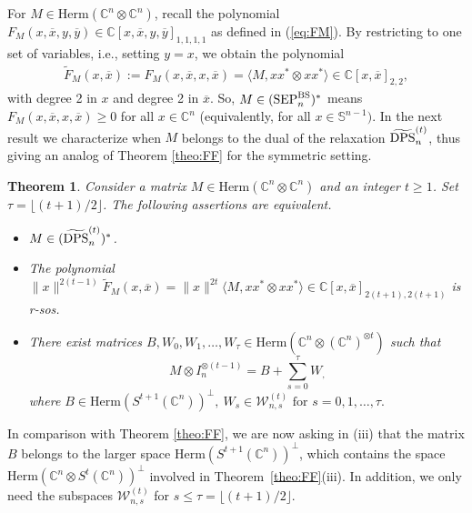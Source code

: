 \documentclass[11pt]{article}
\newcommand{\C}{\ensuremath{\mathbb{C}}} %
\newcommand{\MV}{{\mathcal V}}
\newcommand{\MW}{{\mathcal W}}
\newcommand{\Herm}{\mathrm{Herm}}
\newcommand{\Cnn}{\C^n\ot \C^n}
\newcommand{\Cnnt}{\C^n\ot (\C^n)^{\ot t}}
\newcommand{\sS}{\mathbb S}
\newcommand{\SEP}{\text{\rm SEP}}
\newcommand{\DPS}{\text{\rm DPS}}
\newcommand{\SEPBS}{\SEP^{\BS}}
\newcommand{\tilDPSt}{\widetilde{\DPS}^{(t)}}
\newcommand{\tilF}{\widetilde F}
\newcommand{\ot}{\otimes}
\newcommand{\BS}{\text{\rm BS}}
\newcommand{\ovx}{\overline x}
\newcommand{\ovy}{\overline y}
\theoremstyle{plain}
\newtheorem{theorem}[satz]{Theorem}
\begin{document}
For $M\in\Herm(\Cnn)$, recall the polynomial $F_M(x,\ovx,y,\ovy)\in\C[x,\ovx,y,\ovy]_{1,1,1,1}$ as defined in (\ref{eq:FM}). By restricting to one set of variables, i.e., setting $y=x$, we obtain  the polynomial
\begin{align}\label{eq:FM-BS}
\tilF_M(x,\ovx):=
F_M(x,\ovx,x,\ovx)=\langle M, xx^*\ot xx^*\rangle \in \C[x,\ovx]_{2,2},
\end{align} 
 with degree 2 in $x$ and degree 2 in $\ovx$. So, $M\in (\SEPBS_n)^*$ means %
 $F_M(x,\ovx,x,\ovx)\ge 0$ for all $x\in \C^n$ (equivalently, for all $x\in \sS^{n-1})$.
In the next result we characterize when $M$ belongs to the dual of the relaxation $\tilDPSt_n$, thus giving an   analog of Theorem \ref{theo:FF} for the symmetric setting.

\begin{theorem}\label{theo:FF-BS}
Consider a matrix $M\in \Herm(\Cnn)$ and an integer $t\ge 1$. Set $\tau=\lfloor{(t+1)/2}\rfloor$.
The following assertions are equivalent.
\begin{itemize}
\item[(i)] $M\in (\tilDPSt_n)^*$.
\item[(ii)] The polynomial $\|x\|^{2(t-1)} \tilF_M(x,\ovx)=\|x\|^{2t} \langle M, xx^*\ot xx^*\rangle \in \C[x,\ovx]_{2(t+1),2(t+1)}$ is r-sos.
\item[(iii)] There exist matrices $B,W_0,W_1,\ldots,W_\tau \in\Herm(\Cnnt)$ such that 
$$M\ot I_n^{\ot (t-1)} = B+\sum_{s=0}^\tau W_,$$
where $B\in \Herm(S^{t+1}(\C^n))^\perp,\
W_s\in \MW^{(t)}_{n,s} \text{ for } s=0,1,\ldots,\tau.$
\end{itemize}
\end{theorem}
In comparison with Theorem \ref{theo:FF}, we are now asking in (iii) that the matrix $B$ belongs to the larger space
$\Herm(S^{t+1}(\C^n))^\perp$, which contains the space $\Herm(\C^n\ot S^t(\C^n))^\perp$
involved in Theorem~\ref{theo:FF}(iii). In addition, we only need  the subspaces $\MW^{(t)}_{n,s}$ for $s\le \tau=\lfloor{(t+1)/2}\rfloor$.
\end{document}
